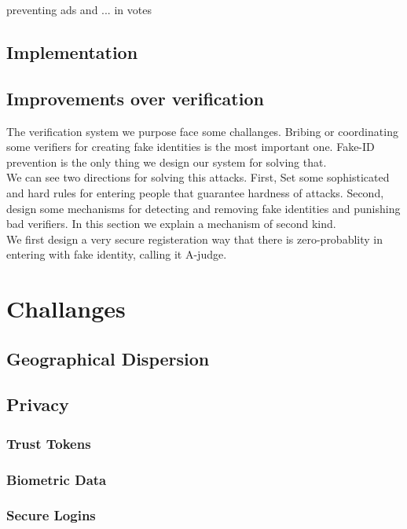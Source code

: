 \documentclass{article}
\begin{document}
 preventing ads and ... in votes\\

\subsection{Implementation}

\subsection{Improvements over verification}
The verification system we purpose face some challanges. Bribing or coordinating some verifiers for creating fake identities is the most important one. Fake-ID prevention is the only thing we design our system for solving that. \\
We can see two directions for solving this attacks. First, Set some sophisticated and hard rules for entering people that guarantee hardness of attacks. Second, design some mechanisms for detecting and removing fake identities and punishing bad verifiers. In this section we explain a mechanism of second kind. \\
We first design a very secure registeration way that there is zero-probablity in entering with fake identity, calling it A-judge. 


\section{Challanges }



\subsection{Geographical Dispersion}

\subsection{Privacy}
\subsubsection*{Trust Tokens}
\subsubsection*{Biometric Data}
\subsubsection*{Secure Logins}
\end{document}

